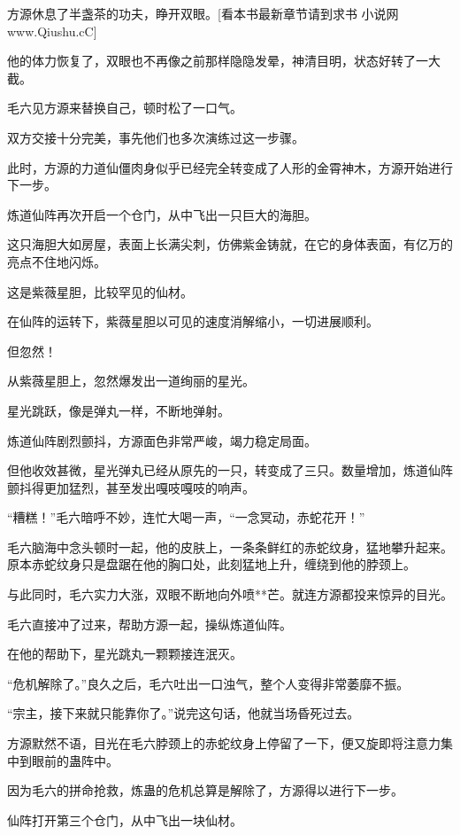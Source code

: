 
\begin{this_body}

方源休息了半盏茶的功夫，睁开双眼。[看本书最新章节请到求书 小说网www.Qiushu.cC]

他的体力恢复了，双眼也不再像之前那样隐隐发晕，神清目明，状态好转了一大截。

毛六见方源来替换自己，顿时松了一口气。

双方交接十分完美，事先他们也多次演练过这一步骤。

此时，方源的力道仙僵肉身似乎已经完全转变成了人形的金霄神木，方源开始进行下一步。

炼道仙阵再次开启一个仓门，从中飞出一只巨大的海胆。

这只海胆大如房屋，表面上长满尖刺，仿佛紫金铸就，在它的身体表面，有亿万的亮点不住地闪烁。

这是紫薇星胆，比较罕见的仙材。

在仙阵的运转下，紫薇星胆以可见的速度消解缩小，一切进展顺利。

但忽然！

从紫薇星胆上，忽然爆发出一道绚丽的星光。

星光跳跃，像是弹丸一样，不断地弹射。

炼道仙阵剧烈颤抖，方源面色非常严峻，竭力稳定局面。

但他收效甚微，星光弹丸已经从原先的一只，转变成了三只。数量增加，炼道仙阵颤抖得更加猛烈，甚至发出嘎吱嘎吱的响声。

“糟糕！”毛六暗呼不妙，连忙大喝一声，“一念冥动，赤蛇花开！”

毛六脑海中念头顿时一起，他的皮肤上，一条条鲜红的赤蛇纹身，猛地攀升起来。原本赤蛇纹身只是盘踞在他的胸口处，此刻猛地上升，缠绕到他的脖颈上。

与此同时，毛六实力大涨，双眼不断地向外喷**芒。就连方源都投来惊异的目光。

毛六直接冲了过来，帮助方源一起，操纵炼道仙阵。

在他的帮助下，星光跳丸一颗颗接连泯灭。

“危机解除了。”良久之后，毛六吐出一口浊气，整个人变得非常萎靡不振。

“宗主，接下来就只能靠你了。”说完这句话，他就当场昏死过去。

方源默然不语，目光在毛六脖颈上的赤蛇纹身上停留了一下，便又旋即将注意力集中到眼前的蛊阵中。

因为毛六的拼命抢救，炼蛊的危机总算是解除了，方源得以进行下一步。

仙阵打开第三个仓门，从中飞出一块仙材。


\end{this_body}

